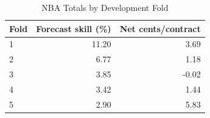 \begin{table}[htbp]\centering\small
\caption{NBA Totals by Development Fold}
\label{tab:nba-fold-comparison}
\begin{tabular}{@{}lrr@{}}\toprule
Fold & Forecast skill (\%) & Net cents/contract\\\midrule
1 & 11.20 & 3.69\\
2 & 6.77 & 1.18\\
3 & 3.85 & -0.02\\
4 & 3.42 & 1.44\\
5 & 2.90 & 5.83\\
\bottomrule\end{tabular}
\end{table}
